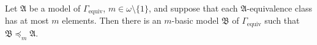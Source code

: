 Let $\mathfrak{A}$ be a model of $\Gamma_{\text{equiv}}$, $m \in \omega \setminus \{1\}$, and suppose that each $\mathfrak{A}$-equivalence class has at most $m$ elements. Then there is an $m$-basic model $\mathfrak{B}$ of $\Gamma_{\text{equiv}}$ such that $\mathfrak{B} \preceq_m \mathfrak{A}$.
